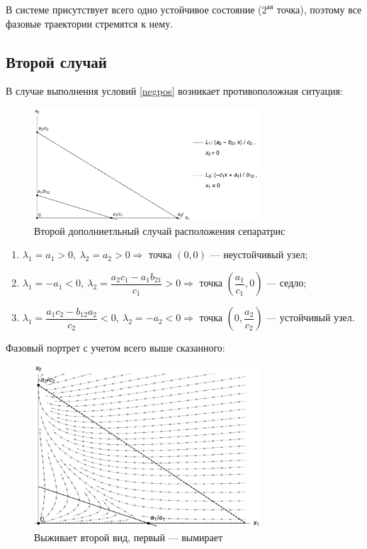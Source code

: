 \documentclass[12pt,a4paper]{article}
\begin{document}
    В системе присутствует всего одно устойчивое состояние ($2^{\text{ая}}$ точка), поэтому все фазовые траектории стремятся к нему.

    \subsection{Второй случай}
    В случае выполнения условий \eqref{negpos} возникает противоположная ситуация:
    
    \begin{figure}[h]
        \centering
        \includegraphics[width=0.75\textwidth]{sep_4.pdf}
        \caption{Второй дополниетльный случай расположения сепаратрис}
        \label{fig:sep_4}
    \end{figure}

    \begin{enumerate}
        \setlength\itemsep{0.5em}
        \item $ \lambda_1 = a_1 > 0,\ \lambda_2 = a_2 > 0 \Rightarrow $ точка $ (0, 0) $ --- неустойчивый узел;
    
        \item $ \lambda_1 = -a_1 < 0,\ \lambda_2 = \dfrac{a_2 c_1 - a_1 b_{21}}{c_1} > 0 \Rightarrow $ точка $ \left( \dfrac{a_1}{c_1}, 0 \right) $ --- седло;
        
        \item  $ \lambda_1 = \dfrac{a_1 c_2 - b_{12} a_2}{c_2} < 0,\ \lambda_2 = -a_2 < 0 \Rightarrow $ точка $ \left( 0, \dfrac{a_2}{c_2} \right) $ --- устойчивый узел.
    \end{enumerate}

    Фазовый портрет с учетом всего выше сказанного:
    \begin{figure}[h]
        \centering
        \includegraphics[width=0.75\textwidth]{phase_4.pdf}
        \caption{Выживает второй вид, первый --- вымирает}
        \label{fig:phase_4}
    \end{figure}
    
\end{document}
